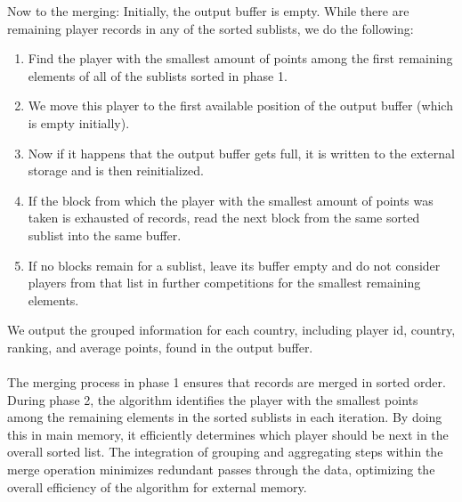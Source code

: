\documentclass{article}
\begin{document}
Now to the merging: Initially, the output buffer is empty. While there are remaining player records in any of the sorted sublists, we do the following: 
\begin{enumerate}
    \item Find the player with the smallest amount of points among the first remaining elements of all of the sublists sorted in phase 1. 
    \item We move this player to the first available position of the output buffer (which is empty initially).
    \item Now if it happens that the output buffer gets full, it is written to the external storage and is then reinitialized. 
    \item If the block from which the player with the smallest amount of points was taken is exhausted of records, read the next block from the same sorted sublist into the same buffer.
    \item If no blocks remain for a sublist, leave its buffer empty and do not consider players from that list in further competitions for the smallest remaining elements.
\end{enumerate}
We output the grouped information for each country, including player id, country, ranking, and average points, found in the output buffer.\\\\
The merging process in phase 1 ensures that records are merged in sorted order. During phase 2, the algorithm identifies the player with the smallest points among the remaining elements in the sorted sublists in each iteration. By doing this in main memory, it efficiently determines which player should be next in the overall sorted list. The integration of grouping and aggregating steps within the merge operation minimizes redundant passes through the data, optimizing the overall efficiency of the algorithm for external memory.
\end{document}
